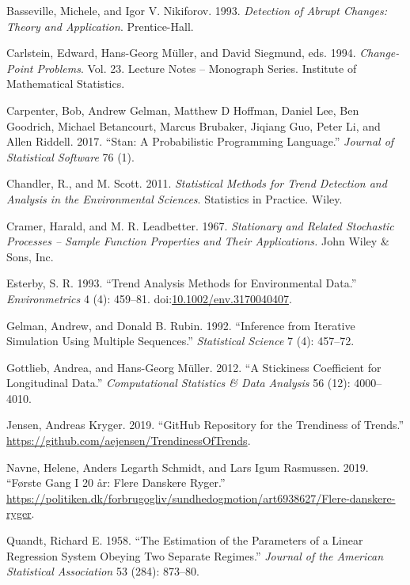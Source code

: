 \documentclass[11pt,]{article}
\theoremstyle{nonumberplain}
\begin{document}
\hypertarget{ref-bassemand1993abrupt}{}
Basseville, Michele, and Igor V. Nikiforov. 1993. \emph{Detection of
Abrupt Changes: Theory and Application}. Prentice-Hall.

\hypertarget{ref-carlstein1994change}{}
Carlstein, Edward, Hans-Georg Müller, and David Siegmund, eds. 1994.
\emph{Change-Point Problems}. Vol. 23. Lecture Notes -- Monograph
Series. Institute of Mathematical Statistics.

\hypertarget{ref-carpenter2017stan}{}
Carpenter, Bob, Andrew Gelman, Matthew D Hoffman, Daniel Lee, Ben
Goodrich, Michael Betancourt, Marcus Brubaker, Jiqiang Guo, Peter Li,
and Allen Riddell. 2017. ``Stan: A Probabilistic Programming Language.''
\emph{Journal of Statistical Software} 76 (1).

\hypertarget{ref-chandler2011statistical}{}
Chandler, R., and M. Scott. 2011. \emph{Statistical Methods for Trend
Detection and Analysis in the Environmental Sciences}. Statistics in
Practice. Wiley.

\hypertarget{ref-cramer1967stationary}{}
Cramer, Harald, and M. R. Leadbetter. 1967. \emph{Stationary and Related
Stochastic Processes -- Sample Function Properties and Their
Applications.} John Wiley \& Sons, Inc.

\hypertarget{ref-esterby1993trenddef}{}
Esterby, S. R. 1993. ``Trend Analysis Methods for Environmental Data.''
\emph{Environmetrics} 4 (4): 459--81.
doi:\href{https://doi.org/10.1002/env.3170040407}{10.1002/env.3170040407}.

\hypertarget{ref-gelman1992inference}{}
Gelman, Andrew, and Donald B. Rubin. 1992. ``Inference from Iterative
Simulation Using Multiple Sequences.'' \emph{Statistical Science} 7 (4):
457--72.

\hypertarget{ref-gottlieb2012stickiness}{}
Gottlieb, Andrea, and Hans-Georg Müller. 2012. ``A Stickiness
Coefficient for Longitudinal Data.'' \emph{Computational Statistics \&
Data Analysis} 56 (12): 4000--4010.

\hypertarget{ref-gptrendStan}{}
Jensen, Andreas Kryger. 2019. ``GitHub Repository for the Trendiness of
Trends.'' \url{https://github.com/aejensen/TrendinessOfTrends}.

\hypertarget{ref-politiken}{}
Navne, Helene, Anders Legarth Schmidt, and Lars Igum Rasmussen. 2019.
``Første Gang I 20 år: Flere Danskere Ryger.''
\url{https://politiken.dk/forbrugogliv/sundhedogmotion/art6938627/Flere-danskere-ryger}.

\hypertarget{ref-quandt1958estimation}{}
Quandt, Richard E. 1958. ``The Estimation of the Parameters of a Linear
Regression System Obeying Two Separate Regimes.'' \emph{Journal of the
American Statistical Association} 53 (284): 873--80.
\end{document}
